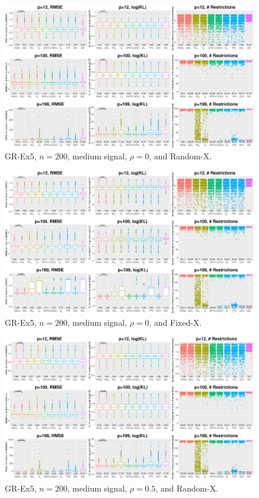 \clearpage
\begin{figure}[!ht]
\centering
\includegraphics[width=\textwidth]{figures/supplement/randomx_GR-Ex5_n200_msnr_rho0.eps}
\caption{GR-Ex5, $n=200$, medium signal, $\rho=0$, and Random-X.}
\end{figure}
\begin{figure}[!ht]
\centering
\includegraphics[width=\textwidth]{figures/supplement/fixedx_GR-Ex5_n200_msnr_rho0.eps}
\caption{GR-Ex5, $n=200$, medium signal, $\rho=0$, and Fixed-X.}
\end{figure}
\clearpage
\begin{figure}[!ht]
\centering
\includegraphics[width=\textwidth]{figures/supplement/randomx_GR-Ex5_n200_msnr_rho05.eps}
\caption{GR-Ex5, $n=200$, medium signal, $\rho=0.5$, and Random-X.}
\end{figure}

